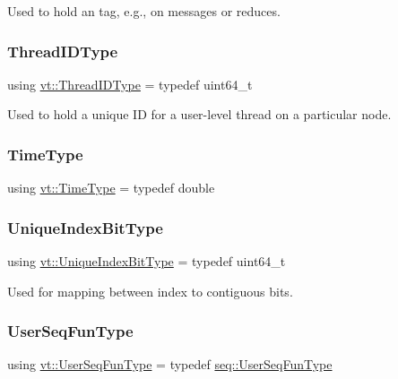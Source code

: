 Used to hold an tag, e.\+g., on messages or reduces. 

\mbox{\label{namespacevt_a9b887d814dd25ff495a0c8270304ac02}} 
\subsubsection{\texorpdfstring{Thread\+I\+D\+Type}{ThreadIDType}}
{\footnotesize\ttfamily using \hyperlink{namespacevt_a9b887d814dd25ff495a0c8270304ac02}{vt\+::\+Thread\+I\+D\+Type} = typedef uint64\+\_\+t}



Used to hold a unique ID for a user-\/level thread on a particular node. 

\mbox{\label{namespacevt_a876a9d0cd5a952859c72de8a46881442}} 
\subsubsection{\texorpdfstring{Time\+Type}{TimeType}}
{\footnotesize\ttfamily using \hyperlink{namespacevt_a876a9d0cd5a952859c72de8a46881442}{vt\+::\+Time\+Type} = typedef double}

\mbox{\label{namespacevt_a913e1f07b5228dd8bb64040dc6dcea14}} 
\subsubsection{\texorpdfstring{Unique\+Index\+Bit\+Type}{UniqueIndexBitType}}
{\footnotesize\ttfamily using \hyperlink{namespacevt_a913e1f07b5228dd8bb64040dc6dcea14}{vt\+::\+Unique\+Index\+Bit\+Type} = typedef uint64\+\_\+t}



Used for mapping between index to contiguous bits. 

\mbox{\label{namespacevt_affe11140b7cc6953030f1f158b40750c}} 
\subsubsection{\texorpdfstring{User\+Seq\+Fun\+Type}{UserSeqFunType}}
{\footnotesize\ttfamily using \hyperlink{namespacevt_affe11140b7cc6953030f1f158b40750c}{vt\+::\+User\+Seq\+Fun\+Type} = typedef \hyperlink{namespacevt_1_1seq_aeb4674d25dcb5d27248b68ec83fad2b6}{seq\+::\+User\+Seq\+Fun\+Type}}

